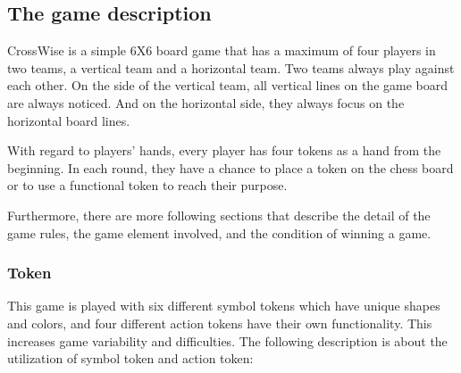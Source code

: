 \subsection{The game description}

CrossWise is a simple 6X6 board game that has a maximum of four players in two teams, a vertical team and a horizontal team. Two teams always play against each other. On the side of the vertical team, all vertical lines on the game board are always noticed. And on the horizontal side, they always focus on the horizontal board lines. 

With regard to players' hands, every player has four tokens as a hand from the beginning. In each round, they have a chance to place a token on the chess board or to use a functional token to reach their purpose.

Furthermore, there are more following sections that describe the detail of the game rules, the game element involved, and the condition of winning a game.    

\subsubsection{Token}

This game is played with six different symbol tokens which have unique shapes and colors, and four different action tokens have their own functionality. This increases game variability and difficulties. The following description is about the utilization of symbol token and action token:

